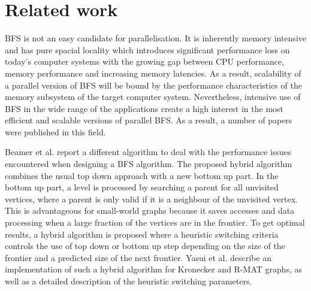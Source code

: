 \documentclass[letterpaper]{article}
\begin{document}

	\section{Related work} \label{sec:rewo} %
		BFS is not an easy candidate for parallelisation.
		It is inherently memory intensive and has pure spacial locality which introduces significant performance loss on today's computer systems with the growing gap between CPU performance, memory performance and increasing memory latencies.
		As a result, scalability of a parallel version of BFS will be bound by the performance characteristics of the memory subsystem of the target computer system. 
		Nevertheless, intensive use of BFS in the wide range of the applications create a high interest in the most efficient and scalable versions of parallel BFS.
		As a result, a number of papers were published in this field. 
		
		Beamer et al.\cite{beamer2011searching} report a different algorithm to deal with the performance issues encountered when designing a BFS algorithm. 
		The proposed hybrid algorithm combines the usual top down approach with a new bottom up part. 
		In the bottom up part, a level is processed by searching a parent for all unvisited vertices, where a parent is only valid if it is a neighbour of the unvisited vertex. 
		This is advantageous for small-world graphs because it saves accesses and data processing when a large fraction of the vertices are in the frontier. 
		To get optimal results, a hybrid algorithm is proposed where a heuristic switching criteria controls the use of top down or bottom up step depending on the size of the frontier and a predicted size of the next frontier. 
		Yasui et al.\cite{6691600} describe an implementation of such a hybrid algorithm for Kronecker and R-MAT graphs, as well as a detailed description of the heuristic switching parameters.
	
\end{document}
